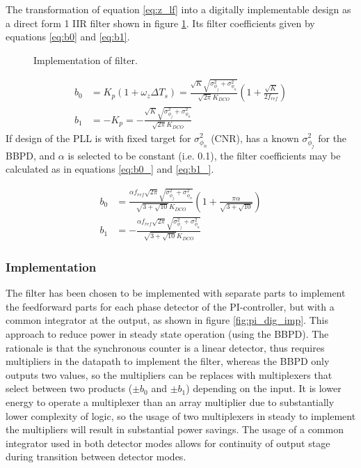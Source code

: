 		The transformation of equation \ref{eq:z_lf} into a digitally implementable design as a direct form 1 IIR filter shown in figure \ref{fig:filt_imple}. Its filter coefficients given by equations \ref{eq:b0} and \ref{eq:b1}.
		\begin{figure}[htb!]
			\center
			\caption{Implementation of filter.}
			\label{fig:filt_imple}
		\end{figure}
		\begin{align}
			b_0 &= K_p (1+\omega_z\Delta T_s)=\frac{\sqrt{K}\sqrt{\sigma^2_{\phi_j} + \sigma^2_{\phi_n}}}{\sqrt{2\pi}K_{DCO}}\left(1+\frac{\sqrt{K}}{2f_{ref}}\right)\label{eq:b0}\\
			 b_1 &= -K_p = - \frac{\sqrt{K}\sqrt{\sigma^2_{\phi_j} + \sigma^2_{\phi_n}}}{\sqrt{2\pi}K_{DCO}}\label{eq:b1}
		\end{align}
		If design of the PLL is with fixed target for $\sigma^2_{\phi_n}$ (CNR), has a known $\sigma^2_{\phi_j}$ for the BBPD, and $\alpha$ is selected to be constant (i.e. 0.1), the filter coefficients may be calculated as in equations \ref{eq:b0_} and \ref{eq:b1_}.

		\begin{align}
			b_0 &= \frac{\alpha f_{ref}\sqrt{2\pi}\sqrt{\sigma^2_{\phi_j} + \sigma^2_{\phi_n}}}{\sqrt{3+\sqrt{10}}K_{DCO}} \left(1+\frac{\pi\alpha}{\sqrt{3+\sqrt{10}}}\right)\label{eq:b0_}\\
			 b_1 &= - \frac{\alpha f_{ref}\sqrt{2\pi}\sqrt{\sigma^2_{\phi_j} + \sigma^2_{\phi_n}}}{\sqrt{3+\sqrt{10}}K_{DCO}}\label{eq:b1_}
		\end{align}




		\subsubsection{Implementation}
			The filter has been chosen to be implemented with separate parts to implement the feedforward parts for each phase detector of the PI-controller, but with a common integrator at the output, as shown in figure \ref{fig:pi_dig_imp}. This approach to reduce power in steady state operation (using the BBPD). The rationale is that the synchronous counter is a linear detector, thus requires multipliers in the datapath to implement the filter, whereas the BBPD only outputs two values, so the multipliers can be replaces with multiplexers that select between two products ($\pm b_0$ and $\pm b_1$) depending on the input. It is lower energy to operate a multiplexer than an array multiplier due to substantially lower complexity of logic, so the usage of two multiplexers in steady to implement the multipliers will result in substantial power savings. The usage of a common integrator used in both detector modes allows for continuity of output stage during transition between detector modes. 

